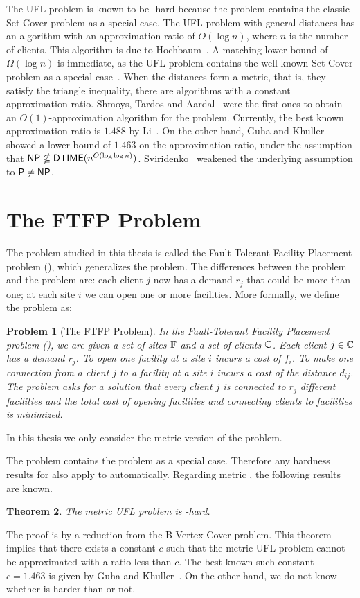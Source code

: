\documentclass[oneside,final]{ucr}
\newtheorem{theorem}{Theorem}
\newtheorem{problem}[theorem]{Problem}
\begin{document}
The UFL problem is known to be \NP-hard because the problem
contains the classic Set Cover problem as a special
case. The UFL problem with general distances has an
algorithm with an approximation ratio of $O(\log n)$, where
$n$ is the number of clients. This algorithm is due to
Hochbaum~\cite{Hochbaum82}. A matching lower bound of
$\Omega(\log n)$ is immediate, as the UFL problem contains
the well-known Set Cover problem as a special
case~\cite{Hochbaum82}. When the distances form a metric,
that is, they satisfy the triangle inequality, there are
algorithms with a constant approximation ratio. Shmoys,
Tardos and Aardal~\cite{ShmoysTA97} were the first ones to
obtain an $O(1)$-approximation algorithm for the {\UFL}
problem. Currently, the best known approximation ratio is
$1.488$ by Li~\cite{Li11}. On the other hand, Guha and
Khuller~\cite{GuhaK98} showed a lower bound of $1.463$ on
the approximation ratio, under the assumption that ${\mbox{\sf NP}}
\nsubseteq {\mbox{\sf DTIME}}(n^{O(\log\log
  n)})$. Sviridenko~\cite{Vygen05} weakened the underlying
assumption to ${\mbox{\sf P}} \neq {\mbox{\sf NP}}$.

\section{The FTFP Problem}
The problem studied in this thesis is called the
Fault-Tolerant Facility Placement problem (\FTFP), which
generalizes the {\UFL} problem. The differences between the
{\UFL} problem and the {\FTFP} problem are: each client $j$
now has a demand $r_j$ that could be more than one; at each
site $i$ we can open one or more facilities. More formally,
we define the {\FTFP} problem as:
\begin{problem}[The FTFP Problem]
  \label{problem:ftfp}
  In the Fault-Tolerant Facility Placement problem
  ({\FTFP}), we are given a set of sites $\mathbb{F}$ and a
  set of clients $\mathbb{C}$. Each client $j \in
  \mathbb{C}$ has a demand $r_j$. To open one facility at a
  site $i$ incurs a cost of $f_i$. To make one connection
  from a client $j$ to a facility at a site $i$ incurs a
  cost of the distance $d_{ij}$. The problem asks for a
  solution that every client $j$ is connected to $r_j$
  different facilities and the total cost of opening
  facilities and connecting clients to facilities is
  minimized.
\end{problem}
In this thesis we only consider the metric version of the
{\FTFP} problem. 

The {\FTFP} problem contains the {\UFL} problem as a special
case. Therefore any hardness results for {\UFL} also apply
to {\FTFP} automatically. Regarding metric {\UFL}, the
following results are known.
\begin{theorem}\label{thm:maxsnp} \cite{GuhaK98}
  The metric UFL problem is {\MaxSNP}-hard.
\end{theorem}
The proof is by a reduction from the B-Vertex Cover
problem. This theorem implies that there exists a constant
$c$ such that the metric UFL problem cannot be approximated
with a ratio less than $c$. The best known such constant
$c=1.463$ is given by Guha and Khuller~\cite{GuhaK98}.  On
the other hand, we do not know whether {\FTFP} is harder
than {\UFL} or not.
\end{document}
